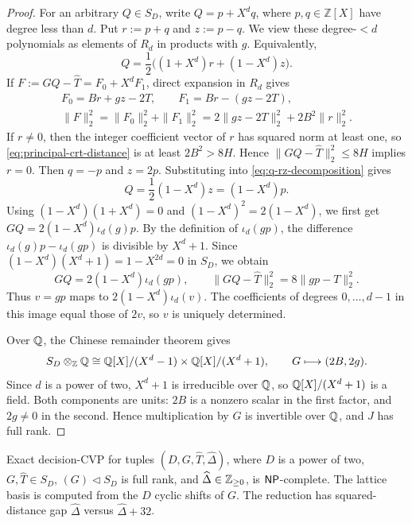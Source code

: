 \begin{proof}
For an arbitrary \(Q\in S_D\), write \(Q=p+X^dq\), where
\(p,q\in\mathbb Z[X]\) have degree less than \(d\).  Put \(r:=p+q\) and
\(z:=p-q\).  We view these degree-\(<d\)
polynomials as elements of \(R_d\) in products with \(g\).  Equivalently,
\begin{equation}
\label{eq:q-rz-decomposition}
 Q=\frac12\bigl((1+X^d)r+(1-X^d)z\bigr).
\end{equation}
If
\(F:=GQ-\widehat T=F_0+X^dF_1\), direct expansion in \(R_d\) gives
\begin{equation}
\label{eq:principal-crt-distance}
\begin{gathered}
 F_0=Br+gz-2T,\qquad F_1=Br-(gz-2T),\\
 \|F\|_2^2=\|F_0\|_2^2+\|F_1\|_2^2
 =2\|gz-2T\|_2^2+2B^2\|r\|_2^2.
\end{gathered}
\end{equation}
If \(r\neq0\), then the integer coefficient vector of \(r\)
has squared norm at
least one, so \eqref{eq:principal-crt-distance} is at least \(2B^2>8H\).
Hence \(\|GQ-\widehat T\|_2^2\leq8H\) implies
\(r=0\). Then \(q=-p\) and \(z=2p\). Substituting into
\eqref{eq:q-rz-decomposition} gives
\[
 Q=\frac12(1-X^d)z=(1-X^d)p.
\]
Using \((1-X^d)(1+X^d)=0\) and
\((1-X^d)^2=2(1-X^d)\), we first get
\(GQ=2(1-X^d)\iota_d(g)p\).  By the definition of \(\iota_d(gp)\), the
difference \(\iota_d(g)p-\iota_d(gp)\) is divisible by \(X^d+1\).  Since
\((1-X^d)(X^d+1)=1-X^{2d}=0\) in \(S_D\), we obtain
\[
 GQ=2(1-X^d)\iota_d(gp),
 \qquad
\|GQ-\widehat T\|_2^2=8\|gp-T\|_2^2.
\]
Thus \(v=gp\) maps to \(2(1-X^d)\iota_d(v)\).  The coefficients
of degrees \(0,\ldots,d-1\) in this image equal those of \(2v\), so \(v\) is
uniquely determined.

Over \(\mathbb Q\), the Chinese remainder theorem gives
\[
 S_D\otimes_{\mathbb Z}\mathbb Q
 \cong \mathbb Q[X]/(X^d-1)\times\mathbb Q[X]/(X^d+1),
 \qquad
 G\longmapsto(2B,2g).
\]
Since \(d\) is a power of two, \(X^d+1\) is irreducible over \(\mathbb Q\), so
\(\mathbb Q[X]/(X^d+1)\) is a field.  Both components are units: \(2B\) is a
nonzero scalar in the first factor, and \(2g\neq0\) in the second.  Hence
multiplication by \(G\) is invertible over \(\mathbb Q\), and \(J\) has full rank.
\end{proof}

\begin{theorem}
\label{thm:cyclic-cvp}
Exact decision-CVP for tuples
\((D,G,\widehat T,\widehat\Delta)\), where \(D\) is a power of two,
{\(G,\widehat T\in S_D\)}, \((G)\lhd S_D\) is full rank, and
{\(\widehat\Delta\in\mathbb Z_{\geq0}\)}, is
\(\mathsf{NP}\)-complete.  The lattice basis is computed from the
\(D\) cyclic shifts of \(G\).  The reduction has squared-distance gap
\(\widehat\Delta\) versus \(\widehat\Delta+32\).
\end{theorem}

